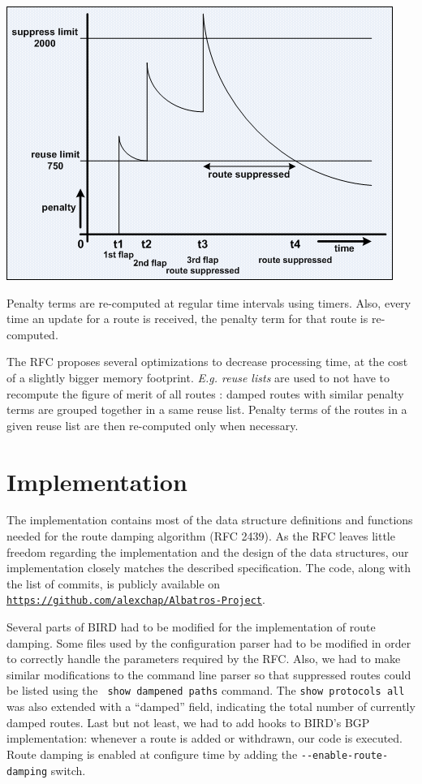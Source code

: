\documentclass[a4paper,english]{IEEEtran}
\begin{document}
\begin{center}
\includegraphics[scale=0.5]{route_damping} 
\par\end{center}

Penalty terms are re-computed at regular time intervals using timers.
Also, every time an update for a route is received, the penalty term
for that route is re-computed.

The RFC proposes several optimizations to decrease processing time,
at the cost of a slightly bigger memory footprint. \textit{E.g. reuse
lists} are used to not have to recompute the figure of merit of all
routes : damped routes with similar penalty terms are grouped together
in a same reuse list. Penalty terms of the routes in a given reuse
list are then re-computed only when necessary.


\section{Implementation}

The implementation contains most of the data structure definitions
and functions needed for the route damping algorithm (RFC 2439).
As the RFC leaves little freedom regarding the implementation and the 
design of the data structures, our implementation closely matches the 
described specification.
The code, along with the list of commits, is publicly available on
{\tt\small \href{https://github.com/alexchap/Albatros-Project}
{https://github.com/alexchap/Albatros-Project}}.

Several parts of BIRD had to be modified for the implementation of route
damping. Some files used by the configuration parser had to be modified 
in order to correctly handle the parameters required by the RFC.
Also, we had to make similar modifications to the command line parser
so that suppressed routes could be listed using the \texttt{\small 
show dampened paths} command.
The \texttt{\small show protocols all} was also extended with a ``damped'' 
field, indicating the total number of currently damped routes.
Last but not least, we had to add hooks to BIRD's BGP implementation:
whenever a route is added or withdrawn, our code is executed.
Route damping is enabled at configure time by adding the 
{\tt\small -{}-enable-route-damping} switch.
\end{document}
